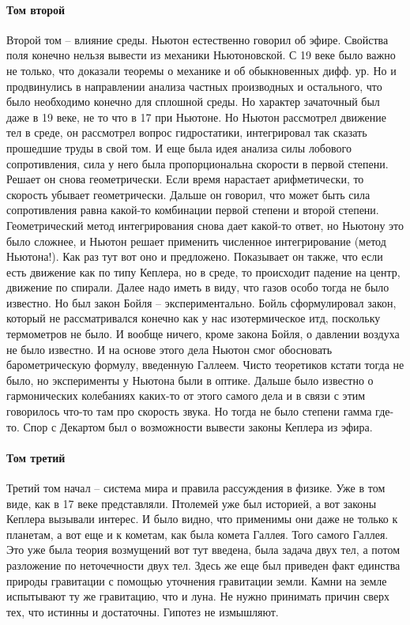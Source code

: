 \documentclass[a4paper, 12pt]{article}
\begin{document}
\paragraph{Том второй}
Второй том -- влияние среды. Ньютон естественно говорил об эфире. 
Свойства поля конечно нельзя вывести из механики Ньютоновской. С 19 веке 
было важно не только, что доказали теоремы о механике и об обыкновенных 
дифф. ур. Но и продвинулись в направлении анализа частных производных 
и остального, что было необходимо конечно для сплошной среды. Но 
характер зачаточный был даже в 19 веке, не то что в 17 при Ньютоне. Но 
Ньютон рассмотрел движение тел в среде, он рассмотрел вопрос 
гидростатики, интегрировал так сказать прошедшие труды в свой том. И еще 
была идея анализа силы лобового сопротивления, сила у него была 
пропорциональна скорости в первой степени. Решает он снова 
геометрически. Если время нарастает арифметически, то скорость убывает 
геометрически. Дальше он говорил, что может быть сила сопротивления 
равна какой-то комбинации первой степени и второй степени. 
Геометрический метод интегрирования снова дает какой-то ответ, но 
Ньютону это было сложнее, и Ньютон решает применить численное 
интегрирование (метод Ньютона!). Как раз тут вот оно и предложено. 
Показывает он также, что если есть движение как по типу Кеплера, но 
в среде, то происходит падение на центр, движение по спирали. Далее надо 
иметь в виду, что газов особо тогда не было известно. Но был закон Бойля 
-- экспериментально. Бойль сформулировал закон, который не 
рассматривался конечно как у нас изотермическое итд, поскольку 
термометров не было. И вообще ничего, кроме закона Бойля, о давлении 
воздуха не было известно. И на основе этого дела Ньютон смог обосновать 
барометрическую формулу, введенную Галлеем. Чисто теоретиков кстати 
тогда не было, но эксперименты у Ньютона были в оптике. Дальше было 
известно о гармонических колебаниях каких-то от этого самого дела 
и в связи с этим говорилось что-то там про скорость звука. Но тогда не 
было степени гамма где-то. Спор с Декартом был о возможности вывести 
законы Кеплера из эфира.

\paragraph{Том третий}
Третий том начал -- система мира и правила рассуждения в физике. Уже 
в том виде, как в 17 веке представляли. Птолемей уже был историей, а вот 
законы Кеплера вызывали интерес. И было видно, что применимы они даже не 
только к планетам, а вот еще и к кометам, как была комета Галлея. Того 
самого Галлея. Это уже была теория возмущений вот тут введена, была 
задача двух тел, а потом разложение по неточечности двух тел. Здесь же 
еще был приведен факт единства природы гравитации с помощью уточнения 
гравитации земли. Камни на земле испытывают ту же гравитацию, что 
и луна. Не нужно принимать причин сверх тех, что истинны и достаточны. 
Гипотез не измышляют.
\end{document}
